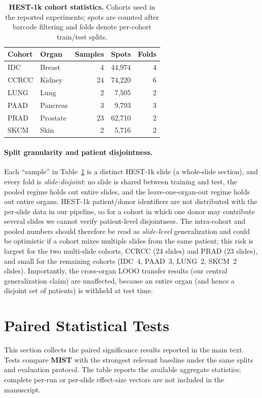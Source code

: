 \documentclass[11pt]{article}
\newcommand{\morph}{\textbf{MIST}}
\begin{document}
\begin{table}[H]
\centering
\caption{\textbf{HEST-1k cohort statistics.} Cohorts used in the reported experiments; spots are counted after barcode filtering and folds denote per-cohort train/test splits.}
\label{tab:cohort_stats}
\small
\begin{tabular}{l l r r r}
\toprule
Cohort & Organ & Samples & Spots & Folds \\
\midrule
IDC          & Breast      & 4 & 44{,}974 & 4 \\
CCRCC        & Kidney      & 24 & 74{,}220 & 6 \\
LUNG         & Lung        &  2 &  7{,}505 & 2 \\
PAAD         & Pancreas    &  3 &  9{,}793 & 3 \\
PRAD         & Prostate    & 23 & 62{,}710 & 2 \\
SKCM         & Skin        &  2 &  5{,}716 & 2 \\
\bottomrule
\end{tabular}
\end{table}

\paragraph{Split granularity and patient disjointness.}
Each ``sample'' in Table~\ref{tab:cohort_stats} is a distinct HEST-1k slide (a whole-slide section),
and every fold is \emph{slide-disjoint}: no slide is shared between training and test, the pooled
regime holds out entire slides, and the leave-one-organ-out regime holds out entire organs. HEST-1k
patient/donor identifiers are not distributed with the per-slide data in our pipeline, so for a cohort
in which one donor may contribute several slides we cannot verify patient-level disjointness. The
intra-cohort and pooled numbers should therefore be read as \emph{slide-level} generalization and
could be optimistic if a cohort mixes multiple slides from the same patient; this risk is largest for
the two multi-slide cohorts, CCRCC (24 slides) and PRAD (23 slides), and small for the remaining
cohorts (IDC~4, PAAD~3, LUNG~2, SKCM~2 slides). Importantly, the cross-organ LOOO transfer results
(our central generalization claim) are unaffected, because an entire organ (and hence a disjoint set
of patients) is withheld at test time.

\section{Paired Statistical Tests}
\label{app:significance}
This section collects the paired significance results reported in the main text. Tests compare
\morph{} with the strongest relevant baseline under the same splits and evaluation protocol. The
table reports the available aggregate statistics; complete per-run or per-slide effect-size vectors
are not included in the manuscript.
\end{document}
